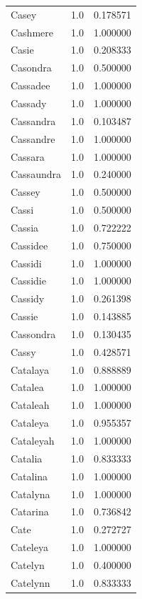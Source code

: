 \documentclass[
  letterpaper,
  DIV=11,
  numbers=noendperiod]{scrreprt}
\begin{document}
\begin{tabular}{lrr}
Casey           &   1.0 &   0.178571 \\
Cashmere        &   1.0 &   1.000000 \\
Casie           &   1.0 &   0.208333 \\
Casondra        &   1.0 &   0.500000 \\
Cassadee        &   1.0 &   1.000000 \\
Cassady         &   1.0 &   1.000000 \\
Cassandra       &   1.0 &   0.103487 \\
Cassandre       &   1.0 &   1.000000 \\
Cassara         &   1.0 &   1.000000 \\
Cassaundra      &   1.0 &   0.240000 \\
Cassey          &   1.0 &   0.500000 \\
Cassi           &   1.0 &   0.500000 \\
Cassia          &   1.0 &   0.722222 \\
Cassidee        &   1.0 &   0.750000 \\
Cassidi         &   1.0 &   1.000000 \\
Cassidie        &   1.0 &   1.000000 \\
Cassidy         &   1.0 &   0.261398 \\
Cassie          &   1.0 &   0.143885 \\
Cassondra       &   1.0 &   0.130435 \\
Cassy           &   1.0 &   0.428571 \\
Catalaya        &   1.0 &   0.888889 \\
Catalea         &   1.0 &   1.000000 \\
Cataleah        &   1.0 &   1.000000 \\
Cataleya        &   1.0 &   0.955357 \\
Cataleyah       &   1.0 &   1.000000 \\
Catalia         &   1.0 &   0.833333 \\
Catalina        &   1.0 &   1.000000 \\
Catalyna        &   1.0 &   1.000000 \\
Catarina        &   1.0 &   0.736842 \\
Cate            &   1.0 &   0.272727 \\
Cateleya        &   1.0 &   1.000000 \\
Catelyn         &   1.0 &   0.400000 \\
Catelynn        &   1.0 &   0.833333 \\

\end{tabular}
\end{document}
